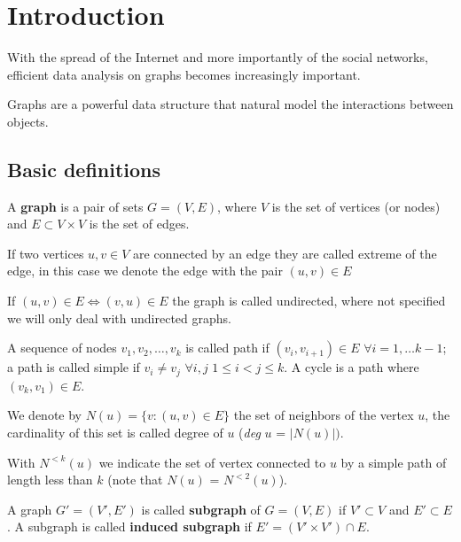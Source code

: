 
\chapter{Introduction}

With the spread of the Internet and more importantly of the social networks, efficient data analysis on graphs becomes increasingly important. 

Graphs are a powerful data structure that natural model the interactions between objects.


\section{Basic definitions}

\begin{definizione}\label{def:graph}
    A \textbf{graph} is a pair of sets $G=(V,E)$, where $V$ is the set of vertices (or nodes) and $E \subset V \times V$ is the set of edges.
\end{definizione}

If two vertices $u, v \in V$ are connected by an edge they are called extreme of the edge, in this case we denote the edge with the pair $(u, v) \in E$

If $(u,v) \in E \Leftrightarrow (v,u) \in E$ the graph is called undirected, where not specified we will only deal with undirected graphs.

A sequence of nodes  $v_{1}, v_{2}, \ldots, v_{k}$ is called path if $(v_{i}, v_{i+1}) \in E$ $\forall i = 1, \ldots k-1$; a path is called simple if $v_{i} \neq v_{j}$ $\forall i,j$ $1 \leq i < j \leq k$. A cycle is a path where $(v_{k}, v_{1}) \in E$.

We denote by $N(u) = \{ v : (u,v) \in E \}$ the set of neighbors of the vertex $u$, the cardinality of this set is called degree of $u$ (\textit{deg} $u$ = $|N(u)|)$. 

With $N^{<k}(u)$ we indicate the set of vertex connected to $u$ by a simple path of length less than $k$ (note that $N(u)$ = $N^{<2}(u)$).

\begin{definizione}\label{def:subgraph}
    A graph $G' = (V', E')$ is called \textbf{subgraph} of $G=(V,E)$ if $V' \subset V$ and $E' \subset E$. A subgraph is called \textbf{induced subgraph} if $E' = (V' \times V') \cap E$.
\end{definizione}

